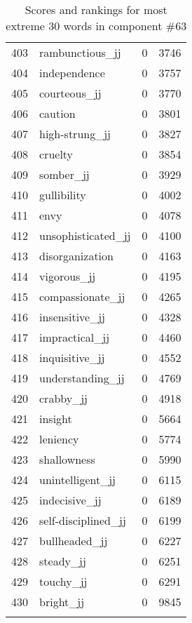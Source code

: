 \begin{longtable}[!htbp]{| rlr@{.}l |}
    403 & rambunctious\_jj & 0 & 3746 \\
    404 & independence & 0 & 3757 \\
    405 & courteous\_jj & 0 & 3770 \\
    406 & caution & 0 & 3801 \\
    407 & high-strung\_jj & 0 & 3827 \\
    408 & cruelty & 0 & 3854 \\
    409 & somber\_jj & 0 & 3929 \\
    410 & gullibility & 0 & 4002 \\
    411 & envy & 0 & 4078 \\
    412 & unsophisticated\_jj & 0 & 4100 \\
    413 & disorganization & 0 & 4163 \\
    414 & vigorous\_jj & 0 & 4195 \\
    415 & compassionate\_jj & 0 & 4265 \\
    416 & insensitive\_jj & 0 & 4328 \\
    417 & impractical\_jj & 0 & 4460 \\
    418 & inquisitive\_jj & 0 & 4552 \\
    419 & understanding\_jj & 0 & 4769 \\
    420 & crabby\_jj & 0 & 4918 \\
    421 & insight & 0 & 5664 \\
    422 & leniency & 0 & 5774 \\
    423 & shallowness & 0 & 5990 \\
    424 & unintelligent\_jj & 0 & 6115 \\
    425 & indecisive\_jj & 0 & 6189 \\
    426 & self-disciplined\_jj & 0 & 6199 \\
    427 & bullheaded\_jj & 0 & 6227 \\
    428 & steady\_jj & 0 & 6251 \\
    429 & touchy\_jj & 0 & 6291 \\
    430 & bright\_jj & 0 & 9845 \\
    \hline
    \caption{Scores and rankings for most extreme 30 words in component \#63} \\
\end{longtable}
